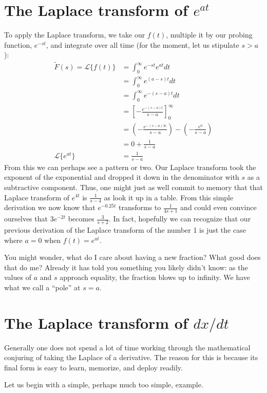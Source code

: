\documentclass[11pt]{book}
\begin{document}
\section{The Laplace transform of $e^{at}$}
To apply the Laplace transform, we take our $f(t)$, multiple it by our probing function, $e^{-st}$, and integrate over all time (for the moment, let us stipulate $s > a$):
\begin{align}
	\tilde{F}(s) = \mathcal{L}\{f(t)\} &= \int_0^{\infty}e^{-st}e^{at} dt \\
	&= \int_0^{\infty}e^{(a-s)t} dt \\
	&= \int_0^{\infty}e^{-(s-a)t} dt \\
	&= \left[-\frac{e^{-(s-a)t}}{s-a}\right]_0^{\infty} \\
	&= \left(-\frac{e^{-(s-a)\infty}}{s-a}\right) - \left(-\frac{e^0}{s-a}\right) \\
	&= 0 + \frac{1}{s-a} \\
	\mathcal{L}\{e^{at}\} &= \frac{1}{s-a}
\end{align}
From this we can perhaps see a pattern or two. Our Laplace transform took the exponent of the exponential and dropped it down in the denominator with $s$ as a subtractive component. Thus, one might just as well commit to memory that that Laplace transform of $e^{4t}$ is $\frac{1}{s - 4}$ as look it up in a table. From this simple derivation we now know that $e^{-0.25t}$ transforms to $\frac{1}{4s + 1}$ and could even convince ourselves that $3e^{-2t}$ becomes $\frac{3}{s+2}$. In fact, hopefully we can recognize that our previous derivation of the Laplace transform of the number 1 is just the case where $a = 0$ when $f(t) = e^{at}$.

You might wonder, what do I care about having a new fraction? What good does that do me? Already it has told you something you likely didn't know: as the values of $a$ and $s$ approach equality, the fraction blows up to infinity. We have what we call a ``pole'' at $s = a$.

\section{The Laplace transform of $dx/dt$}
Generally one does not spend a lot of time working through the mathematical conjuring of taking the Laplace of a derivative. The reason for this is because its final form is easy to learn, memorize, and deploy readily. 

Let us begin with a simple, perhaps much too simple, example.
\end{document}
